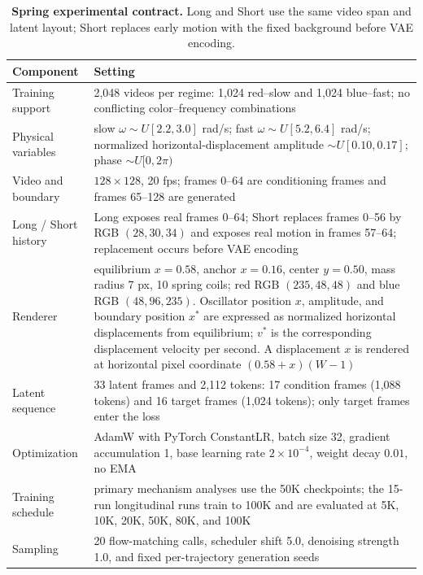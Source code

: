 \begin{table}[!htbp]
  \centering
  \caption{\textbf{Spring experimental contract.} Long and Short use the same
  video span and latent layout; Short replaces early motion with the fixed
  background before VAE encoding.}
  \label{tab:experimental-contract}
  \begin{tabular}{p{}p{}}
    \toprule
    Component & Setting \\
    \midrule
    Training support & 2,048 videos per regime: 1,024 red--slow and 1,024 blue--fast; no conflicting color--frequency combinations \\
    Physical variables & slow $\omega\sim U[2.2,3.0]$ rad/s; fast $\omega\sim U[5.2,6.4]$ rad/s; normalized horizontal-displacement amplitude $\sim U[0.10,0.17]$; phase $\sim U[0,2\pi)$ \\
    Video and boundary & $128\times128$, 20 fps; frames 0--64 are conditioning frames and frames 65--128 are generated \\
    Long / Short history & Long exposes real frames 0--64; Short replaces frames 0--56 by RGB $(28,30,34)$ and exposes real motion in frames 57--64; replacement occurs before VAE encoding \\
    Renderer & equilibrium $x=0.58$, anchor $x=0.16$, center $y=0.50$, mass radius 7 px, 10 spring coils; red RGB $(235,48,48)$ and blue RGB $(48,96,235)$. Oscillator position $x$, amplitude, and boundary position $x^*$ are expressed as normalized horizontal displacements from equilibrium; $v^*$ is the corresponding displacement velocity per second. A displacement $x$ is rendered at horizontal pixel coordinate $(0.58+x)(W-1)$ \\
    Latent sequence & 33 latent frames and 2,112 tokens: 17 condition frames (1,088 tokens) and 16 target frames (1,024 tokens); only target frames enter the loss \\
    Optimization & AdamW with PyTorch ConstantLR, batch size 32, gradient accumulation 1, base learning rate $2\times10^{-4}$, weight decay $0.01$, no EMA \\
    Training schedule & primary mechanism analyses use the 50K checkpoints; the 15-run longitudinal runs train to 100K and are evaluated at 5K, 10K, 20K, 50K, 80K, and 100K \\
    Sampling & 20 flow-matching calls, scheduler shift 5.0, denoising strength 1.0, and fixed per-trajectory generation seeds \\
    \bottomrule
  \end{tabular}
\end{table}


